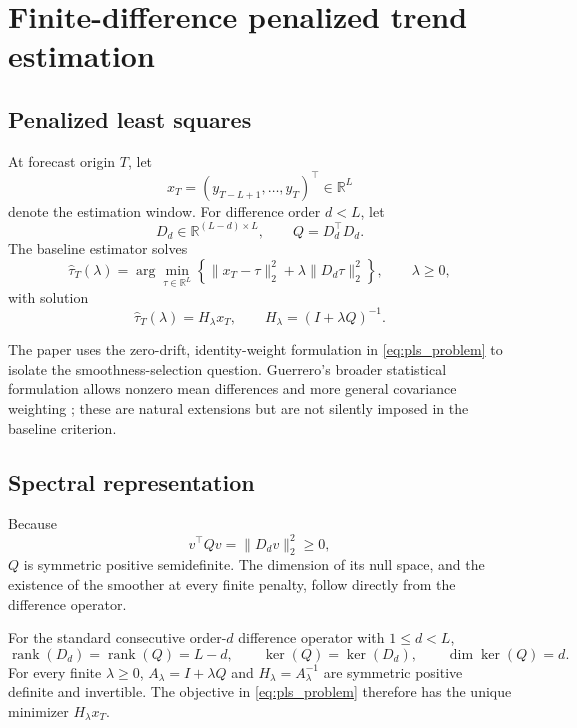 \section{Finite-difference penalized trend estimation}

\subsection{Penalized least squares}

At forecast origin $T$, let
\begin{equation}
\label{eq:observation_window}
x_T=(y_{T-L+1},\ldots,y_T)^\top\in\mathbb{R}^{L}
\end{equation}
denote the estimation window. For difference order $d<L$, let
\begin{equation}
\label{eq:penalty_gram_matrix}
D_d\in\mathbb{R}^{(L-d)\times L},
\qquad
Q=D_d^\top D_d.
\end{equation}
The baseline estimator solves
\begin{equation}
\label{eq:pls_problem}
\widehat\tau_T(\lambda)
=
\arg\min_{\tau\in\mathbb{R}^{L}}
\left\{
\|x_T-\tau\|_2^2+\lambda\|D_d\tau\|_2^2
\right\},
\qquad \lambda\ge0,
\end{equation}
with solution
\begin{equation}
\label{eq:H}
\widehat\tau_T(\lambda)
=
H_\lambda x_T,
\qquad
H_\lambda=(I+\lambda Q)^{-1}.
\end{equation}

The paper uses the zero-drift, identity-weight formulation in \cref{eq:pls_problem} to isolate the smoothness-selection question. Guerrero's broader statistical formulation allows nonzero mean differences and more general covariance weighting \cite{guerrero2007penalized}; these are natural extensions but are not silently imposed in the baseline criterion.

\subsection{Spectral representation}

Because
\begin{equation}
\label{eq:penalty_positive_semidefinite}
v^\top Qv=\|D_dv\|_2^2\ge0,
\end{equation}
$Q$ is symmetric positive semidefinite. The dimension of its null
space, and the existence of the smoother at every finite penalty, follow
directly from the difference operator.

\begin{proposition}
\label{prop:pls_wellposed}
For the standard consecutive order-$d$ difference operator with
$1\le d<L$,
\begin{equation}
\label{eq:penalty_rank}
\operatorname{rank}(D_d)=\operatorname{rank}(Q)=L-d,
\qquad
\ker(Q)=\ker(D_d),\qquad
\dim\ker(Q)=d.
\end{equation}
For every finite $\lambda\ge0$, $A_\lambda=I+\lambda Q$
and $H_\lambda=A_\lambda^{-1}$ are symmetric positive definite and
invertible. The objective in \cref{eq:pls_problem} therefore has the
unique minimizer $H_\lambda x_T$.
\end{proposition}

